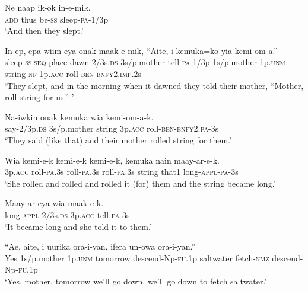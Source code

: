 \ea
\gll  Ne  naap  ik-ok  in-e-mik. \\
\textsc{add}  thus  be-\textsc{ss}  sleep-\textsc{pa}-1/3p \\
\glt ‘And then they slept.’ \\
\z


\ea
\gll  In-ep,  epa  wiim-eya  onak  maak-e-mik,  “Aite,                     i  kemuka=ko  yia  kemi-om-a.” \\
sleep-\textsc{ss.seq}  place  dawn-2/3s.\textsc{ds}  3s/p.mother  tell-\textsc{pa}-1/3p  1s/p.mother  1p.\textsc{unm}  string-\textsc{nf}  1p.\textsc{acc}  roll-\textsc{ben}-\textsc{bnfy}2.\textsc{imp}.2s \\


\glt ‘They slept, and in the morning when it dawned they told their mother, “Mother, roll string for us.” ’ \\
\z


\ea
\gll  Na-iwkin  onak  kemuka  wia  kemi-om-a-k. \\
say-2/3p.\textsc{ds}  3s/p.mother  string  3p.\textsc{acc}  roll-\textsc{ben}-\textsc{bnfy}2.\textsc{pa}-3s \\
\glt ‘They said (like that) and their mother rolled string for them.’ \\
\z


\ea
\gll  Wia  kemi-e-k  kemi-e-k  kemi-e-k,  kemuka  nain  maay-ar-e-k. \\
3p.\textsc{acc}  roll-\textsc{pa}.3s  roll-\textsc{pa}.3s  roll-\textsc{pa}.3s  string  that1  long-\textsc{appl}-\textsc{pa}-3s \\
\glt ‘She rolled and rolled and rolled it (for) them and the string became long.’ \\
\z


\ea
\gll  Maay-ar-eya  wia  maak-e-k. \\
long-\textsc{appl}-2/3s.\textsc{ds}  3p.\textsc{acc}  tell-\textsc{pa}-3s \\
\glt ‘It became long and she told it to them.’ \\
\z


\ea
\gll  “Ae,  aite,  i  uurika  ora-i-yan,  ifera                  un-owa  ora-i-yan.” \\
Yes  1s/p.mother  1p.\textsc{unm}  tomorrow  descend-Np-\textsc{fu}.1p  saltwater  fetch-\textsc{nmz}  descend-Np-\textsc{fu}.1p \\


\glt ‘Yes, mother, tomorrow we’ll go down, we’ll go down to fetch saltwater.’ \\
\z


